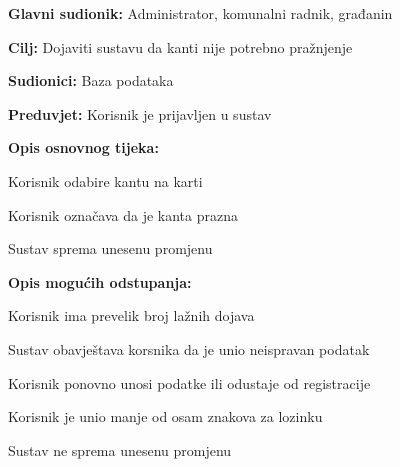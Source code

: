 				
				
					
				
				
					
				
				
					\noindent {}
					\begin{packed_item}
	
						\item \textbf{Glavni sudionik: }Administrator, komunalni radnik, građanin
						\item  \textbf{Cilj:} Dojaviti sustavu da kanti nije potrebno pražnjenje
						\item  \textbf{Sudionici:} Baza podataka
						\item  \textbf{Preduvjet:} Korisnik je prijavljen u sustav
						\item  \textbf{Opis osnovnog tijeka:}
						
						\item[] \begin{packed_enum}
	
							\item Korisnik odabire kantu na karti
							\item Korisnik označava da je kanta prazna
							\item Sustav sprema unesenu promjenu
							
						\end{packed_enum}
						
						\item  \textbf{Opis mogućih odstupanja:}
						
						\item[] \begin{packed_item}
	
							\item[2.a] Korisnik ima prevelik broj lažnih dojava
							
							\item[] \begin{packed_enum}
								
								\item Sustav obavještava korsnika da je unio neispravan podatak
								\item Korisnik ponovno unosi podatke ili odustaje od registracije
								
							\end{packed_enum}
							\item[2.b] Korisnik je unio manje od osam znakova za lozinku
							
								\item[] \begin{packed_enum}
								
								\item Sustav ne sprema unesenu promjenu
								
							\end{packed_enum}
							
						\end{packed_item}
					\end{packed_item}
				
